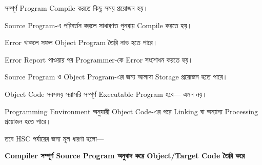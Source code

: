 
\begin{compacttwocolpoints}

\item সম্পূর্ণ Program Compile করতে কিছু সময় প্রয়োজন হয়।

\item Source Program-এ পরিবর্তন করলে সাধারণত পুনরায় Compile করতে হয়।

\item Error থাকলে সফল Object Program তৈরি নাও হতে পারে।

\item Error Report পাওয়ার পর Programmer-কে Error সংশোধন করতে হয়।

\item Source Program ও Object Program-এর জন্য আলাদা Storage
প্রয়োজন হতে পারে।

\end{compacttwocolpoints}


Object Code সবসময় সরাসরি সম্পূর্ণ Executable Program হবে—
এমন নয়।

Programming Environment অনুযায়ী Object Code-এর পরে
Linking বা অন্যান্য Processing প্রয়োজন হতে পারে।

তবে HSC পর্যায়ের জন্য মূল ধারণা হলো—

\begin{center}

\textbf{
Compiler সম্পূর্ণ Source Program অনুবাদ করে
Object/Target Code তৈরি করে
}

\end{center}


